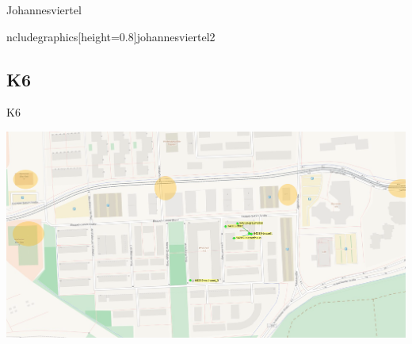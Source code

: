 \documentclass{beamer}
\begin{document}
\begin{frame}{Johannesviertel}
\begin{center}
ncludegraphics[height=0.8\textheight]{johannesviertel2}
\end{center}
\end{frame}

\subsection{K6}
\begin{frame}{K6}
\begin{center}
\includegraphics[width=\textwidth]{k62}
\end{center}
\end{frame}
\end{document}
